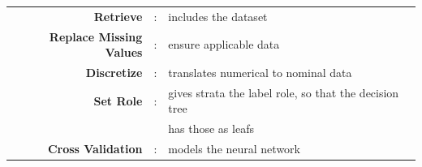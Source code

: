 	\begin{tabular}{r c l}
		\textbf{Retrieve} & : & includes the dataset\\
		\textbf{Replace Missing Values} & : & ensure applicable data\\
		\textbf{Discretize} & : & translates numerical to nominal data \\
		\textbf{Set Role} & : & gives strata the label role, so that the decision tree\\
		&& has those as leafs\\		
		\textbf{Cross Validation} & : & models the neural network \\
	\end{tabular}
	